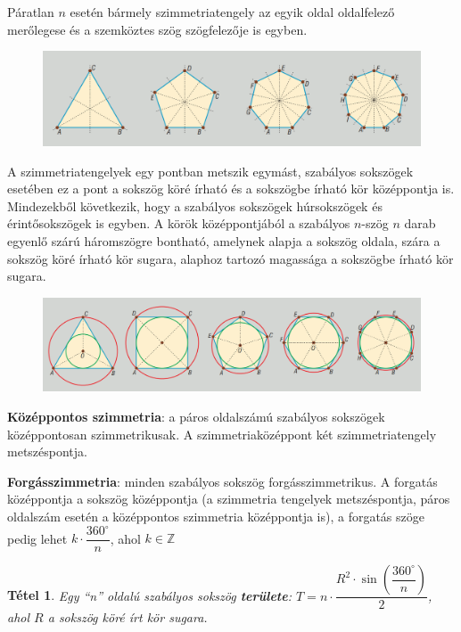\documentclass[12pt,a4paper]{article}
\newtheorem{theorem}{Tétel} [section]
\begin{document}
Páratlan $n$ esetén bármely szimmetriatengely az egyik oldal oldalfelező merőlegese és a szemköztes szög szögfelezője is egyben.

\begin{figure}[h]
\centering
\includegraphics[scale=0.3]{geometry/szimmetria2}
\end{figure}

A szimmetriatengelyek egy pontban metszik egymást, szabályos sokszögek esetében ez a pont a sokszög köré írható és a sokszögbe írható kör középpontja is. Mindezekből következik, hogy a szabályos sokszögek húrsokszögek és érintősokszögek is egyben. A körök középpontjából a szabályos $n$-szög $n$ darab egyenlő szárú háromszögre bontható, amelynek alapja a sokszög oldala, szára a sokszög köré írható kör sugara, alaphoz tartozó magassága a sokszögbe írható kör sugara.

\begin{figure}[h]
\centering
\includegraphics[scale=0.3]{geometry/szimmetria3}
\end{figure}

\textbf{Középpontos szimmetria}: a páros oldalszámú szabályos sokszögek középpontosan szimmetrikusak. A szimmetriaközéppont két szimmetriatengely metszéspontja.

\textbf{Forgásszimmetria}: minden szabályos sokszög forgásszimmetrikus. A forgatás középpontja a sokszög középpontja (a szimmetria tengelyek metszéspontja, páros oldalszám esetén a középpontos szimmetria középpontja is), a forgatás szöge pedig lehet $k\cdot \dfrac{360^\circ}{n}$, ahol $k\in \mathbb{Z}$
\newpage
\begin{theorem}
Egy ``n'' oldalú szabályos sokszög \textbf{területe}: $T=n\cdot \dfrac{R^2\cdot \sin \left(\dfrac{360^\circ}{n} \right)}{2}$, ahol $R$ a sokszög köré írt kör sugara.
\end{theorem}
\end{document}
